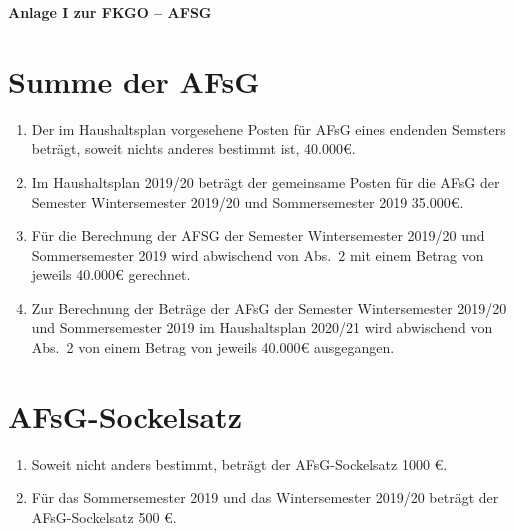 \documentclass{article}
\begin{document}
\begin{center}
    \huge \textbf{Anlage I zur FKGO -- AFSG}
\end{center}


\section{Summe der AFsG}
\begin{enumerate}[(1)]
    \item Der im Haushaltsplan vorgesehene Posten für AFsG eines endenden Semsters beträgt, soweit nichts anderes bestimmt ist, 40.000€.
    \item Im Haushaltsplan 2019/20 beträgt der gemeinsame Posten für die AFsG der Semester Wintersemester 2019/20 und Sommersemester 2019 35.000€.
    \item Für die Berechnung der AFSG der Semester Wintersemester 2019/20 und Sommersemester 2019 wird abwischend von Abs.\ 2 mit einem Betrag von jeweils 40.000€ gerechnet.
    \item Zur Berechnung der Beträge der AFsG der Semester Wintersemester 2019/20 und Sommersemester 2019 im Haushaltsplan 2020/21 wird abwischend von Abs.\ 2 von einem Betrag von jeweils 40.000€ ausgegangen.
\end{enumerate}

\section{AFsG-Sockelsatz}
\begin{enumerate}[(1)]
	\item Soweit nicht anders bestimmt, beträgt der AFsG-Sockelsatz 1000 €.
    \item Für das Sommersemester 2019 und das Wintersemester 2019/20 beträgt der AFsG-Sockelsatz 500 €.
\end{enumerate}
\end{document}
